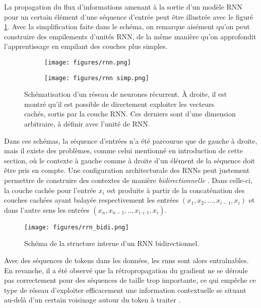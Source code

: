 \documentclass[12pt, twoside]{report}
\begin{document}
La propagation du flux d'informations amenant à la sortie d'un modèle RNN pour un certain élément d'une séquence d'entrée peut être illustrée avec le figuré \ref{fig:rnn}. Avec la simplification faite dans le schéma, on remarque aisément qu'on peut construire des empilements d'unités RNN, de la même manière qu'on approfondit l'apprentissage en empilant des couches plus simples.\autocite[chap.~9, p. 1-4]{jurafsky}

\begin{figure}[!h]
    \centering
    \begin{subfigure}[b]{0.3\textwidth}
        \texttt{[image: figures/rnn.png]}
    \end{subfigure}
    \begin{subfigure}[b]{0.4\textwidth}
        \texttt{[image: figures/rnn simp.png]}
    \end{subfigure}
    \caption{Schématisation d'un réseau de neurones récurrent. À droite, il est montré qu'il est possible de directement exploiter les vecteurs cachés, sortis par la couche RNN. Ces derniers sont d'une dimension arbitraire, à définir avec l'unité de RNN.}
    \label{fig:rnn}
\end{figure}

Dans ces schémas, la séquence d'entrées n'a été parcourue que de gauche à droite, mais il existe des problèmes, comme celui mentionné en introduction de cette section, où le contexte à gauche comme à droite d'un élément de la séquence doit être pris en compte. Une configuration architecturale des RNNs peut justement permettre de construire des contextes de manière \textit{bidirectionnelle} \autocite{bi_rnn}. Dans celle-ci, la couche cachée pour l'entrée $x_i$ est produite à partir de la concaténation des couches cachées ayant balayée respectivement les entrées $(x_1, x_2, ..., x_{i-1}, x_{i})$ et dans l'autre sens les entrées $(x_n, x_{n-1}, .., x_{i+1}, x_i)$. \autocite[chap.~9, p. 11-13]{jurafsky}

\begin{figure}[!h]
    \centering
    \texttt{[image: figures/rrn\_bidi.png]}
    \caption{Schéma de la structure interne d'un RNN bidirectionnel.}
    \label{fig:rnn_bidi}
\end{figure}

Avec des séquences de tokens dans les données, les \Glspl{rnn} sont alors entraînables. En revanche, il a été observé que la rétropropagation du gradient ne se déroule pas correctement pour des séquences de taille trop importante, ce qui empêche ce type de réseau d'exploiter efficacement une information contextuelle se situant au-delà d'un certain voisinage autour du \gls{token} à traiter \autocite[p. 25-26]{fourrier}.
\end{document}
